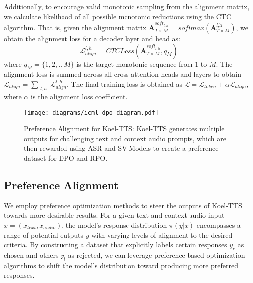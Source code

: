 Additionally, to encourage valid monotonic sampling from the alignment matrix, we calculate likelihood of all possible monotonic reductions using the CTC algorithm. That is, given the alignment matrix $\mathbf{A}^{\textit{soft}_{l,h}}_{T\times M}=\textit{softmax}(\mathbf{A}_{T\times M}^{\textit{l,h}})$, we obtain the alignment loss for a decoder layer and head as: $$\mathcal{L}_{\textit{align}}^{l,h} = \textit{CTCLoss}\left(\mathbf{A}^{\textit{soft}_{l,h}}_{T\times M}, q_{M}\right)$$
where $q_{M}=\{1, 2, \dots M\}$ is the target monotonic sequence from $1$ to $M$. The alignment loss is summed across all cross-attention heads and layers to obtain $\mathcal{L}_{\textit{align}} = \sum_{\substack{l,h}} \mathcal{L}_{\textit{align}}^{l,h}$.
The final training loss is obtained as $\mathcal{L} = \mathcal{L}_\textit{token} + \alpha \mathcal{L}_{\textit{align}}$, where $\alpha$ is the alignment loss coefficient.


\begin{figure*}[tp]
    \centering
    \texttt{[image: diagrams/icml\_dpo\_diagram.pdf]}
\vspace{-8mm}    
\caption{Preference Alignment for Koel-TTS: Koel-TTS generates multiple outputs for challenging text and context audio prompts, which are then rewarded using ASR and SV Models to create a preference dataset for DPO and RPO.}
\vspace{-4mm}
\label{figs:dpo_diag}
\end{figure*}

\subsection{Preference Alignment}\label{sec:pref_align}


We employ preference optimization methods to steer the outputs of Koel-TTS towards more desirable results. 
For a given text and context audio input $x=(x_\textit{text}, x_\textit{audio})$, the model's response distribution $\pi(y|x)$ encompasses a range of potential outputs $y$ with varying levels of alignment to the desired criteria. By constructing a dataset that explicitly labels certain responses $y_c$ as chosen and others $y_l$ as rejected, we can leverage preference-based optimization algorithms to shift the model's distribution toward producing more preferred responses.


